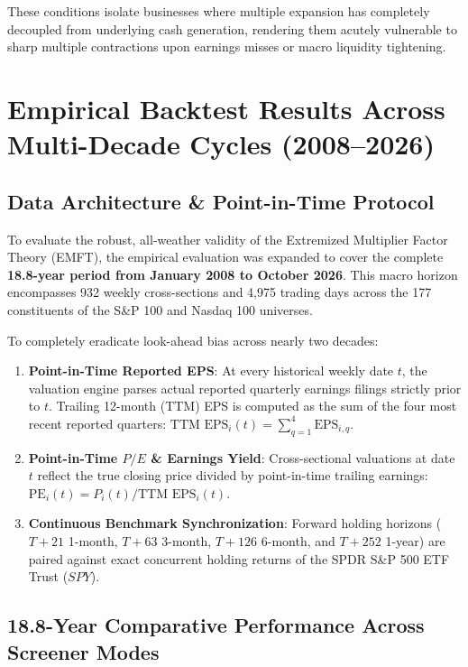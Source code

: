 \documentclass[11pt]{article}
\begin{document}
These conditions isolate businesses where multiple expansion has completely decoupled from underlying cash generation, rendering them acutely vulnerable to sharp multiple contractions upon earnings misses or macro liquidity tightening.

\section{Empirical Backtest Results Across Multi-Decade Cycles (2008--2026)}

\subsection{Data Architecture \& Point-in-Time Protocol}
To evaluate the robust, all-weather validity of the Extremized Multiplier Factor Theory (EMFT), the empirical evaluation was expanded to cover the complete \textbf{18.8-year period from January 2008 to October 2026}. This macro horizon encompasses 932 weekly cross-sections and 4,975 trading days across the 177 constituents of the S\&P 100 and Nasdaq 100 universes.

To completely eradicate look-ahead bias across nearly two decades:
\begin{enumerate}
    \item \textbf{Point-in-Time Reported EPS}: At every historical weekly date $t$, the valuation engine parses actual reported quarterly earnings filings strictly prior to $t$. Trailing 12-month (TTM) EPS is computed as the sum of the four most recent reported quarters: $\text{TTM EPS}_i(t) = \sum_{q=1}^4 \text{EPS}_{i, q}$.
    \item \textbf{Point-in-Time $P/E$ \& Earnings Yield}: Cross-sectional valuations at date $t$ reflect the true closing price divided by point-in-time trailing earnings: $\text{PE}_i(t) = P_i(t) / \text{TTM EPS}_i(t)$.
    \item \textbf{Continuous Benchmark Synchronization}: Forward holding horizons ($T+21$ 1-month, $T+63$ 3-month, $T+126$ 6-month, and $T+252$ 1-year) are paired against exact concurrent holding returns of the SPDR S\&P 500 ETF Trust ($SPY$).
\end{enumerate}

\subsection{18.8-Year Comparative Performance Across Screener Modes}
\end{document}
